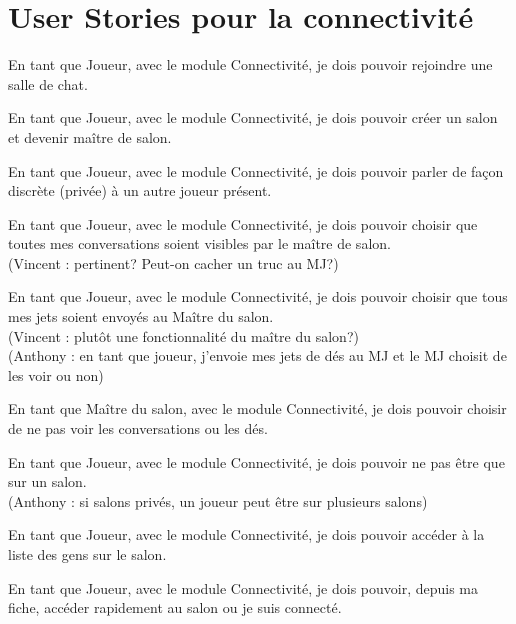 \chapter{User Stories pour la connectivité}

En tant que Joueur, avec le module Connectivité, je dois pouvoir rejoindre une
salle de chat.
~

En tant que Joueur, avec le module Connectivité, je dois pouvoir créer un salon
et devenir maître de salon.
~

En tant que Joueur, avec le module Connectivité, je dois pouvoir parler de façon
discrète (privée) à un autre joueur présent.

En tant que Joueur, avec le module Connectivité, je dois pouvoir choisir que
toutes mes conversations soient visibles par le maître de salon.\\
(Vincent : pertinent? Peut-on cacher un truc au MJ?)
~

En tant que Joueur, avec le module Connectivité, je dois pouvoir choisir que
tous mes jets soient envoyés au Maître du salon.\\
(Vincent : plutôt une fonctionnalité du maître du salon?)\\
(Anthony : en tant que joueur, j'envoie mes jets de dés au MJ et le MJ
choisit de les voir ou non)
~

En tant que Maître du salon, avec le module Connectivité, je dois pouvoir
choisir de ne pas voir les conversations ou les dés.
~

En tant que Joueur, avec le module Connectivité, je dois pouvoir ne pas être que
sur un salon.\\
(Anthony : si salons privés, un joueur peut être sur plusieurs salons)
~

En tant que Joueur, avec le module Connectivité, je dois pouvoir accéder à la
liste des gens sur le salon.
~

En tant que Joueur, avec le module Connectivité, je dois pouvoir, depuis ma
fiche, accéder rapidement au salon ou je suis connecté.
~


\clearpage